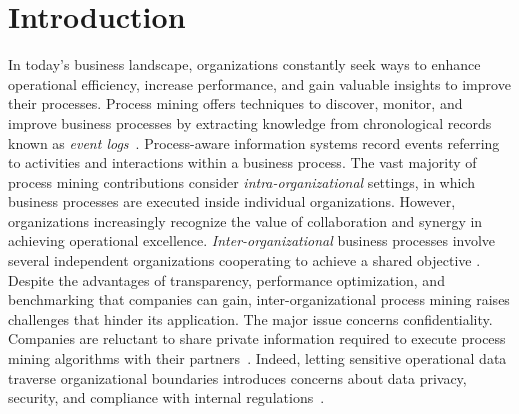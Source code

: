 \section{Introduction}
\label{sec:introduction}
\begin{comment}
\todo[inline]{%
	´CDC: Status corrente secondo me. Abbiamo\ldots
	Un'intro affabile ma che dobbiamo ricalibrare per toglierla dal pantano della TEE e puntare dritto al nostro obiettivo dichiarato e mantenuto, con vista sul potenziale inespresso.\\
	Un motivating scenario che però resta staccato dal resto.\\
	Un related work che però dovrebbe spostarsi sul far capire cosa facciamo di più e di diverso, o di simile ma rivisto.\\
	Una overview eccellente dell'architettura che però non è connessa con l'esempio.\\
	Una overview accurata delle interazioni dei moduli (e quando lo spazio è poco è il caso di fare il merge tra le due cose per risparmiare spazio, come ci dicemmo) -- anche qui senza esempio, dunque capire cosa si fa dove è arduo. Non per me o per te, ma perché conosciamo il lavoro. Chi non lo conosce, non ha assolutamente idea di cosa voglia dire fare il merge degli eventi da tracce provienienti da actor diversi rimettendoli in ordine così da preservare integrità temporale, per esempio.\\
	Una discussion/evaluation ben congegnata in cui però manca la parte quantitativa e la qualitativa è ancora da dettagliare.\\
	Una conclusione.%
}
\end{comment}
In today's business landscape, organizations constantly seek ways to enhance operational efficiency, increase performance, and gain valuable insights to improve their processes. Process mining offers techniques to discover, monitor, and improve business processes by extracting knowledge from chronological records known as \textit{event logs}~\cite{DBLP:books/sp/22/WeerdtW22}.
Process-aware information systems record events referring to activities and interactions within a business process. The vast majority of process mining contributions consider \textit{intra-organizational} settings, in which business processes are executed inside individual organizations. However, organizations increasingly recognize the value of collaboration and synergy in achieving operational excellence. \textit{Inter-organizational} business processes involve several independent organizations cooperating to achieve a shared objective \cite{van2011intra}. Despite the advantages of transparency, performance optimization, and benchmarking that companies can gain, inter-organizational process mining raises challenges that hinder its application. The major issue concerns confidentiality. Companies are reluctant to share private information required to execute process mining algorithms with their partners~\cite{liu2009challenges}. Indeed, letting sensitive operational data traverse organizational boundaries introduces concerns about data privacy, security, and compliance with internal regulations~\cite{muller2021trust}. 
